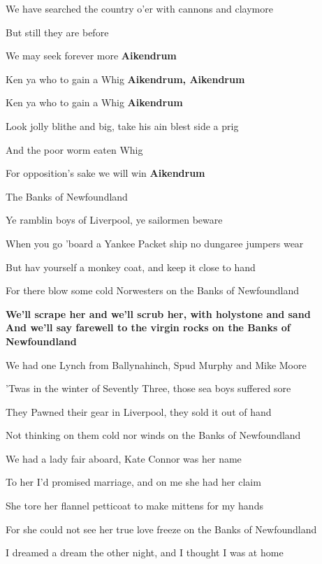 \documentclass[letterpaper,9pt]{article}
\begin{document}
We have searched the country o'er with cannons and claymore

But still they are before

We may seek forever more \textbf{Aikendrum}

\hfill

Ken ya who to gain a Whig \textbf{Aikendrum, Aikendrum}

Ken ya who to gain a Whig \textbf{Aikendrum}

Look jolly blithe and big, take his ain blest side a prig

And the poor worm eaten Whig

For opposition's sake we will win \textbf{Aikendrum}

\newpage
{}
\huge
The Banks of Newfoundland

\hfill

\Large
Ye ramblin boys of Liverpool, ye sailormen beware

When you go 'board a Yankee Packet ship no dungaree jumpers wear

But hav yourself a monkey coat, and keep it close to hand

For there blow some cold Norwesters on the Banks of Newfoundland

\textbf{We'll scrape her and we'll scrub her, with holystone and sand\\
And we'll say farewell to the virgin rocks on the Banks of Newfoundland}

\hfill

We had one Lynch from Ballynahinch, Spud Murphy and Mike Moore

'Twas in the winter of Sevently Three, those sea boys suffered sore

They Pawned their gear in Liverpool, they sold it out of hand

Not thinking on them cold nor winds on the Banks of Newfoundland

\hfill

We had a lady fair aboard, Kate Connor was her name

To her I'd promised marriage, and on me she had her claim

She tore her flannel petticoat to make mittens for my hands

For she could not see her true love freeze on the Banks of Newfoundland

\hfill

I dreamed a dream the other night, and I thought I was at home
\end{document}

